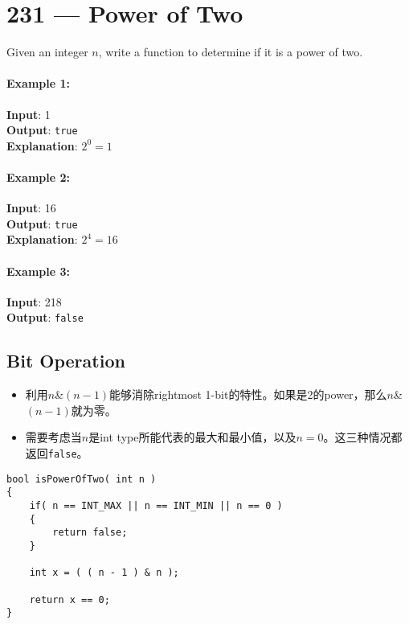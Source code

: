 \section{231 --- Power of Two}
Given an integer $n$, write a function to determine if it is a power of two.

\paragraph{Example 1:}

\begin{flushleft}
\textbf{Input}: 1
\\
\textbf{Output}: \texttt{true} 
\\
\textbf{Explanation}: $2^0 = 1$
\end{flushleft}


\paragraph{Example 2:}

\begin{flushleft}
\textbf{Input}: 16
\\
\textbf{Output}: \texttt{true}
\\
\textbf{Explanation}: $2^4 = 16$
\end{flushleft}

\paragraph{Example 3:}
\begin{flushleft}
\textbf{Input}: 218
\\
\textbf{Output}: \texttt{false}
\end{flushleft}
\subsection{Bit Operation}

\begin{itemize}
\item 利用$n$\&$(n-1)$能够消除rightmost 1-bit的特性。如果是2的power，那么$n$\&$(n-1)$就为零。
\item 需要考虑当$n$是int type所能代表的最大和最小值，以及$n=0$。这三种情况都返回\texttt{false}。
\end{itemize}

\setcounter{lstlisting}{0}
\begin{lstlisting}[style=customc, caption={Bit Operation}]
bool isPowerOfTwo( int n )
{
    if( n == INT_MAX || n == INT_MIN || n == 0 )
    {
        return false;
    }

    int x = ( ( n - 1 ) & n );

    return x == 0;
}
\end{lstlisting}